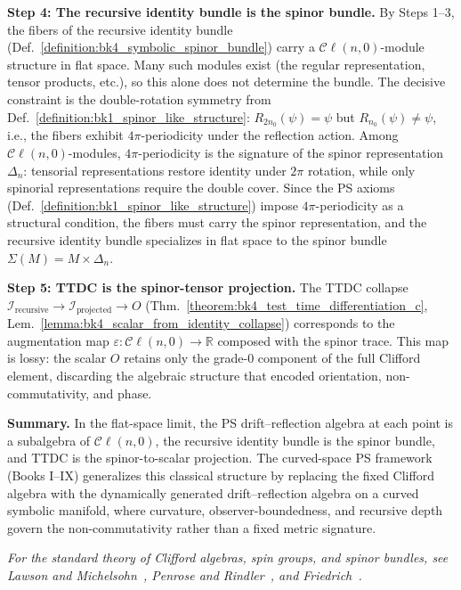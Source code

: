 \begin{scholium}
\medskip\noindent\textbf{Step 4: The recursive identity bundle is the spinor bundle.}
By Steps 1--3, the fibers of the recursive identity bundle
(Def.~\ref{definition:bk4_symbolic_spinor_bundle}) carry a
$\mathcal{C}\ell(n,0)$-module structure in flat space. Many such
modules exist (the regular representation, tensor products, etc.),
so this alone does not determine the bundle.
The decisive constraint is the double-rotation symmetry from
Def.~\ref{definition:bk1_spinor_like_structure}:
$R_{2n_0}(\psi) = \psi$ but $R_{n_0}(\psi) \neq \psi$,
i.e., the fibers exhibit $4\pi$-periodicity under the reflection
action. Among $\mathcal{C}\ell(n,0)$-modules, $4\pi$-periodicity
is the signature of the spinor representation $\Delta_n$:
tensorial representations restore identity under $2\pi$ rotation,
while only spinorial representations require the double cover.
Since the PS axioms (Def.~\ref{definition:bk1_spinor_like_structure})
impose $4\pi$-periodicity as a structural condition, the fibers
must carry the spinor representation, and the recursive identity
bundle specializes in flat space to the spinor bundle
$\Sigma(M) = M \times \Delta_n$.

\medskip\noindent\textbf{Step 5: TTDC is the spinor-tensor projection.}
The TTDC collapse
$\mathcal{I}_{\mathrm{recursive}} \to \mathcal{I}_{\mathrm{projected}} \to O$
(Thm.~\ref{theorem:bk4_test_time_differentiation_c},
Lem.~\ref{lemma:bk4_scalar_from_identity_collapse})
corresponds to the augmentation map
$\varepsilon: \mathcal{C}\ell(n,0) \to \mathbb{R}$
composed with the spinor trace. This map is lossy: the scalar $O$ retains
only the grade-0 component of the full Clifford element, discarding the
algebraic structure that encoded orientation, non-commutativity, and phase.

\medskip\noindent\textbf{Summary.}
In the flat-space limit, the PS drift--reflection algebra at each point
is a subalgebra of $\mathcal{C}\ell(n,0)$, the recursive identity bundle
is the spinor bundle, and TTDC is the spinor-to-scalar projection.
The curved-space PS framework (Books I--IX) generalizes this classical
structure by replacing the fixed Clifford algebra with the dynamically
generated drift--reflection algebra on a curved symbolic manifold,
where curvature, observer-boundedness, and recursive depth govern the
non-commutativity rather than a fixed metric signature.

\emph{For the standard theory of Clifford algebras, spin groups, and spinor
bundles, see Lawson and Michelsohn~\cite{lawson1989spin},
Penrose and Rindler~\cite{penrose1984spinors}, and
Friedrich~\cite{friedrich_dirac}.}
\end{scholium}

